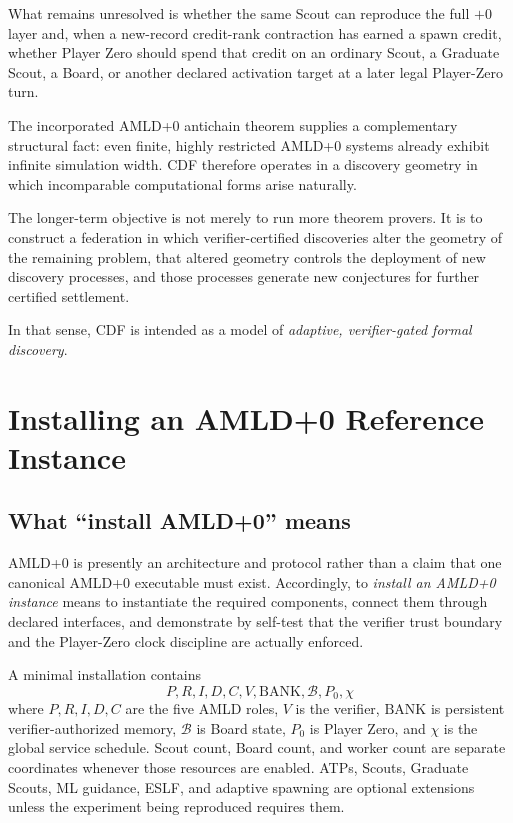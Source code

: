 \documentclass[11pt]{article}
\theoremstyle{definition}
\newcommand{\BANK}{\mathrm{BANK}}
\newcommand{\Board}{\mathcal{B}}
\begin{document}
What remains unresolved is whether the same Scout can reproduce the full $+0$ layer and, when a new-record credit-rank contraction has earned a spawn credit, whether Player Zero should spend that credit on an ordinary Scout, a Graduate Scout, a Board, or another declared activation target at a later legal Player-Zero turn.

The incorporated AMLD+0 antichain theorem supplies a complementary structural fact: even finite, highly restricted AMLD+0 systems already exhibit infinite simulation width. CDF therefore operates in a discovery geometry in which incomparable computational forms arise naturally.

The longer-term objective is not merely to run more theorem provers. It is to construct a federation in which verifier-certified discoveries alter the geometry of the remaining problem, that altered geometry controls the deployment of new discovery processes, and those processes generate new conjectures for further certified settlement.

In that sense, CDF is intended as a model of \emph{adaptive, verifier-gated formal discovery}.

\appendix
\section{Installing an AMLD+0 Reference Instance}
\label{app:install-amld0}

\subsection{What ``install AMLD+0'' means}

AMLD+0 is presently an architecture and protocol rather than a claim that one canonical AMLD+0 executable must exist. Accordingly, to \emph{install an AMLD+0 instance} means to instantiate the required components, connect them through declared interfaces, and demonstrate by self-test that the verifier trust boundary and the Player-Zero clock discipline are actually enforced.

A minimal installation contains
\[
\boxed{P,R,I,D,C,V,\BANK,\Board,P_0,\chi}
\]
where $P,R,I,D,C$ are the five AMLD roles, $V$ is the verifier, $\BANK$ is persistent verifier-authorized memory, $\Board$ is Board state, $P_0$ is Player Zero, and $\chi$ is the global service schedule. Scout count, Board count, and worker count are separate coordinates whenever those resources are enabled. ATPs, Scouts, Graduate Scouts, ML guidance, ESLF, and adaptive spawning are optional extensions unless the experiment being reproduced requires them.
\end{document}
